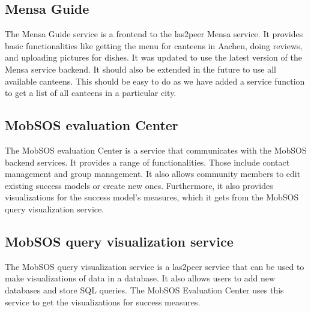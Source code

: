 \subsection{Mensa Guide}
The Mensa Guide service is a frontend to the las2peer Mensa service. It provides basic functionalities like getting the menu for canteens in Aachen, doing reviews, and uploading pictures for dishes. It was updated to use the latest version of the Mensa service backend. It should also be extended in the future to use all available canteens. This should be easy to do as we have added a service function to get a list of all canteens in a particular city.

\subsection{MobSOS evaluation Center}
The MobSOS evaluation Center is a service that communicates with the MobSOS backend services. It provides a range of functionalities. Those include contact management and group management. 
It also allows community members to edit existing success models or create new ones.
Furthermore, it also provides visualizations for the success model's measures, which it gets from the MobSOS query visualization service.

\subsection{MobSOS query visualization service}
The MobSOS query visualization service is a las2peer service that can be used to make visualizations of data in a database. It also allows users to add new databases and store SQL queries. The MobSOS Evaluation Center uses this service to get the visualizations for success measures.




